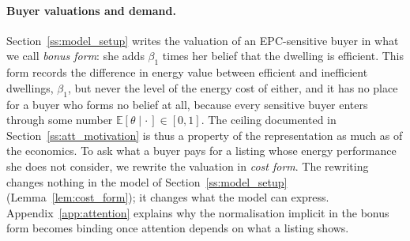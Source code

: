 \paragraph{Buyer valuations and demand.}
Section~\ref{ss:model_setup} writes the valuation of an EPC-sensitive buyer in what we call \emph{bonus form}: she adds $\beta_1$ times her belief that the dwelling is efficient. This form records the difference in energy value between efficient and inefficient dwellings, $\beta_1$, but never the level of the energy cost of either, and it has no place for a buyer who forms no belief at all, because every sensitive buyer enters through some number $\mathbb E[\theta\mid\cdot\,]\in[0,1]$. The ceiling documented in Section~\ref{ss:att_motivation} is thus a property of the representation as much as of the economics. To ask what a buyer pays for a listing whose energy performance she does not consider, we rewrite the valuation in \emph{cost form}. The rewriting changes nothing in the model of Section~\ref{ss:model_setup} (Lemma~\ref{lem:cost_form}); it changes what the model can express. Appendix~\ref{app:attention} explains why the normalisation implicit in the bonus form becomes binding once attention depends on what a listing shows.
